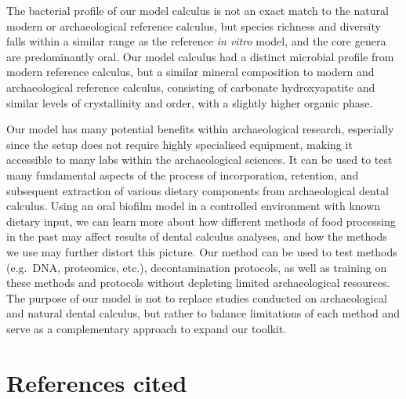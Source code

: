 \documentclass[
  letterpaper,
]{book}
\begin{document}
The bacterial profile of our model calculus is not an exact match to the
natural modern or archaeological reference calculus, but species
richness and diversity falls within a similar range as the reference
\emph{in vitro} model, and the core genera are predominantly oral. Our
model calculus had a distinct microbial profile from modern reference
calculus, but a similar mineral composition to modern and archaeological
reference calculus, consisting of carbonate hydroxyapatite and similar
levels of crystallinity and order, with a slightly higher organic phase.

Our model has many potential benefits within archaeological research,
especially since the setup does not require highly specialised
equipment, making it accessible to many labs within the archaeological
sciences. It can be used to test many fundamental aspects of the process
of incorporation, retention, and subsequent extraction of various
dietary components from archaeological dental calculus. Using an oral
biofilm model in a controlled environment with known dietary input, we
can learn more about how different methods of food processing in the
past may affect results of dental calculus analyses, and how the methods
we use may further distort this picture. Our method can be used to test
methods (e.g.~DNA, proteomics, etc.), decontamination protocols, as well
as training on these methods and protocols without depleting limited
archaeological resources. The purpose of our model is not to replace
studies conducted on archaeological and natural dental calculus, but
rather to balance limitations of each method and serve as a
complementary approach to expand our toolkit.

\hypertarget{references-cited}{%
\section{References cited}\label{references-cited}}
\end{document}
